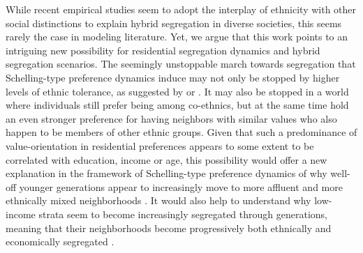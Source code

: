\documentclass{article}
\begin{document}
While recent empirical studies seem to adopt the interplay of ethnicity with other social distinctions to explain hybrid segregation in diverse societies, this seems rarely the case in modeling literature. Yet, we argue that this work points to an intriguing new possibility for residential segregation dynamics and hybrid segregation scenarios. The seemingly unstoppable march towards segregation that Schelling-type preference dynamics induce may not only be stopped by higher levels of ethnic tolerance, as suggested by \textcite{xie2012modeling} or \textcite{hatna2014combining}. It may also be stopped in a world where individuals still prefer being among co-ethnics, but at the same time hold an even stronger preference for having neighbors with similar values who also happen to be members of other ethnic groups. Given that such a predominance of value-orientation in residential preferences appears to some extent to be correlated with education, income or age, this possibility would offer a new explanation in the framework of Schelling-type preference dynamics of why well-off younger generations appear to increasingly move to more affluent and more ethnically mixed neighborhoods \autocite{clark2018can,clark2002residential}. It would also help to understand why low-income strata seem to become increasingly segregated through generations, meaning that their neighborhoods become progressively both ethnically and economically segregated \autocite{clark2002residential}. 

\end{document}
